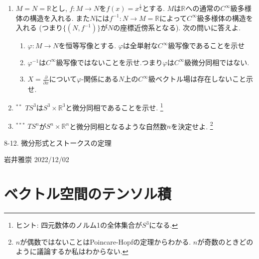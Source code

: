 \documentclass[dvipdfmx,a4paper,11pt]{article}
\newcommand{\R}{\mathbb{R}}
\theoremstyle{definition}
\newcommand{\pdrv}[2]{\frac{\partial #1}{\partial #2}}
\begin{document}
\begin{enumerate}[label=\textbf{問}2.\arabic*]
\item  $M=N=\R$とし, $f : M \rightarrow N$を$f(x) = x^{\frac{1}{3}}$とする. 
$M$は$\R$への通常の$C^{\infty}$級多様体の構造を入れる. 
また$N$には$f^{-1} : N \rightarrow M = \R$によって$C^{\infty}$級多様体の構造を入れる
(つまり$\{ (N,f^{-1}) \}$が$N$の座標近傍系となる).
次の問いに答えよ.
\begin{enumerate}
\item $\varphi : M \rightarrow N$を恒等写像とする. $\varphi$は全単射な$C^{\infty}$級写像であることを示せ%
\item $\varphi^{-1}$は$C^{\infty}$級写像ではないことを示せ.つまり$\varphi$は$C^{\infty}$級微分同相ではない. 
\item $X = \pdrv{}{x}$について$\varphi$-関係にある$N$上の$C^{\infty}$級ベクトル場は存在しないこと示せ. 
\end{enumerate}


\item $^{**}$ $TS^3 $は$S^3 \times \R^{3}$と微分同相であることを示せ. \footnote{ヒント: 四元数体のノルム1の全体集合が$S^{3}$になる.}
\item$^{***} $ $TS^n$が$S^n \times \R^{n}$と微分同相となるような自然数$n$を決定せよ. \footnote{$n$が偶数ではないことはPoincare-Hopfの定理からわかる. $n$が奇数のときどのように議論するか私はわからない.}


\end{enumerate}

\newpage

\begin{center}
{\Large 8-12. 微分形式とストークスの定理}
\end{center}
\begin{flushright}
 岩井雅崇 2022/12/02
\end{flushright}

\section{ベクトル空間のテンソル積}
\end{document}
